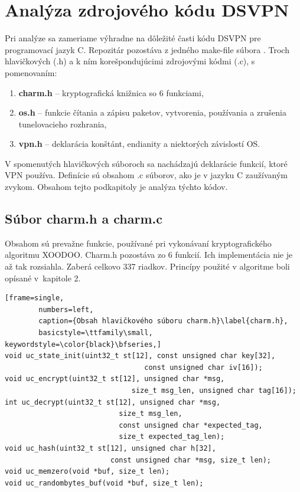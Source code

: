\section{Analýza zdrojového kódu DSVPN}
Pri analýze sa zameriame výhradne na dôležité časti kódu DSVPN pre programovací jazyk C. Repozitár pozostáva z jedného make-file súbora \cite{make}. Troch hlavičkových (.h) a k ním korešpondujúcimi zdrojovými kódmi (.c), s pomenovaním:
 \begin{enumerate}
 	\item \textbf{charm.h} -- kryptografická knižnica so 6 funkciami,
 	\item \textbf{os.h} -- funkcie čítania a zápisu paketov, vytvorenia, používania a zrušenia tunelovacieho rozhrania,
 	\item \textbf{vpn.h} -- deklarácia konštánt, endianity\cite{endianita} a niektorých závislostí OS.
 \end{enumerate}

V spomenutých hlavičkových súboroch sa nachádzajú deklarácie funkcií, ktoré VPN používa. Definície sú obsahom .c súborov, ako je v jazyku C zaužívaným zvykom. Obsahom tejto podkapitoly je analýza týchto kódov. 
 
\subsection{Súbor charm.h a charm.c}
Obsahom sú prevažne funkcie, používané pri vykonávaní kryptografického algoritmu XOODOO. Charm.h pozostáva zo 6 funkcií. Ich implementácia nie je až tak rozsiahla. Zaberá celkovo 337 riadkov. Princípy použité v algoritme boli opísané v~kapitole 2.  
 
   \begin{minipage}{\linewidth} 	
  	\begin{lstlisting}[frame=single,
  		numbers=left,
  		caption={Obsah hlavičkového súboru charm.h}\label{charm.h},
  		basicstyle=\ttfamily\small, keywordstyle=\color{black}\bfseries,]
void uc_state_init(uint32_t st[12], const unsigned char key[32], 
				  			 	 const unsigned char iv[16]);
void uc_encrypt(uint32_t st[12], unsigned char *msg, 
							  size_t msg_len, unsigned char tag[16]);	
int uc_decrypt(uint32_t st[12], unsigned char *msg, 
			   			   size_t msg_len,
			   			   const unsigned char *expected_tag, 
			   			   size_t expected_tag_len);
void uc_hash(uint32_t st[12], unsigned char h[32],
			 			 const unsigned char *msg, size_t len);
void uc_memzero(void *buf, size_t len);
void uc_randombytes_buf(void *buf, size_t len);
  		 	\end{lstlisting}
  	\end{minipage}\\
     
